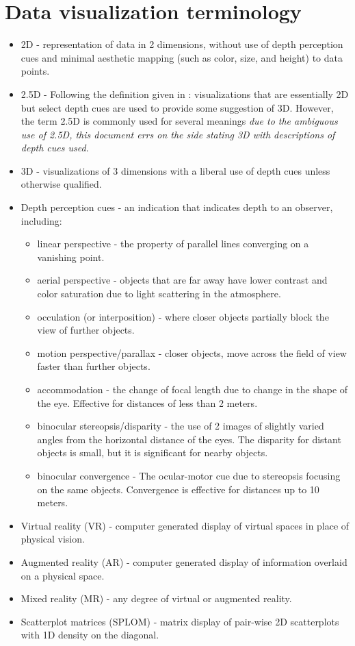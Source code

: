 \documentclass{monashthesis}
\begin{document}
\section{Data visualization terminology}\label{sec:3d-terminology}

\begin{itemize}
\tightlist
\item
  2D - representation of data in 2 dimensions, without use of depth
  perception cues and minimal aesthetic mapping (such as color, size,
  and height) to data points.
\item
  2.5D - Following the definition given in
  \textcite{ware_designing_2000}: visualizations that are essentially 2D
  but select depth cues are used to provide some suggestion of 3D.
  However, the term 2.5D is commonly used for several meanings \emph{due
  to the ambiguous use of 2.5D, this document errs on the side stating
  3D with descriptions of depth cues used}.
\item
  3D - visualizations of 3 dimensions with a liberal use of depth cues
  unless otherwise qualified.
\item
  Depth perception cues - an indication that indicates depth to an
  observer, including:

  \begin{itemize}
  \tightlist
  \item
    linear perspective - the property of parallel lines converging on a
    vanishing point.
  \item
    aerial perspective - objects that are far away have lower contrast
    and color saturation due to light scattering in the atmosphere.
  \item
    occulation (or interposition) - where closer objects partially block
    the view of further objects.
  \item
    motion perspective/parallax - closer objects, move across the field
    of view faster than further objects.
  \item
    accommodation - the change of focal length due to change in the
    shape of the eye. Effective for distances of less than 2 meters.
  \item
    binocular stereopsis/disparity - the use of 2 images of slightly
    varied angles from the horizontal distance of the eyes. The
    disparity for distant objects is small, but it is significant for
    nearby objects.
  \item
    binocular convergence - The ocular-motor cue due to stereopsis
    focusing on the same objects. Convergence is effective for distances
    up to 10 meters.
  \end{itemize}
\item
  Virtual reality (VR) - computer generated display of virtual spaces in
  place of physical vision.
\item
  Augmented reality (AR) - computer generated display of information
  overlaid on a physical space.
\item
  Mixed reality (MR) - any degree of virtual or augmented reality.
\item
  Scatterplot matrices (SPLOM) - matrix display of pair-wise 2D
  scatterplots with 1D density on the diagonal.
\end{itemize}
\end{document}
